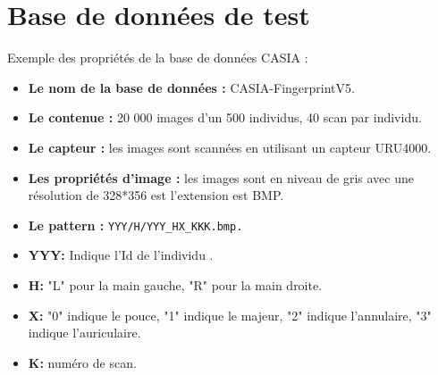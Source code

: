 \section{Base de données de test}
\label{exemplebddtest}
Exemple des propriétés de la base de données CASIA :\\
\begin{itemize}
	\item \textbf{Le nom de la base de données :} CASIA-FingerprintV5.
	\item	\textbf{Le contenue : }20 000 images d'un 500 individus, 40 scan par individu. 
	\item	\textbf{Le capteur :} les images sont scannées en utilisant un capteur URU4000.
	\item	\textbf{Les propriétés d’image : }les images sont en niveau de gris avec une résolution de 328*356 est l'extension est BMP.
	\item	\textbf{Le pattern :} \verb|YYY/H/YYY_HX_KKK.bmp.|  
	
	\item	\textbf{YYY:} Indique l'Id de l'individu .
	\item\textbf{H:} "L" pour la main gauche, "R" pour la main droite.
	\item \textbf{X:} "0" indique le pouce, "1" indique le majeur, "2" indique l'annulaire, "3" indique l'auriculaire.
	\item	\textbf{K:} numéro de scan.
\end{itemize}

